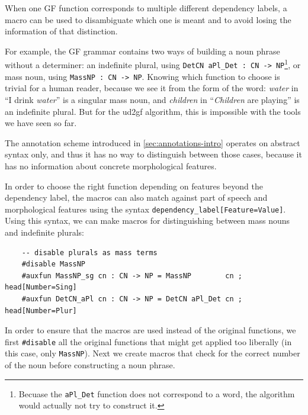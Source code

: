 When one GF function corresponds to multiple different dependency labels, a macro can be used to disambiguate which one is meant and to avoid losing the information of that distinction.

For example, the GF grammar contains two ways of building a noun phrase without a determiner:
an indefinite plural, using \verb|DetCN aPl_Det : CN -> NP|\footnote{Becuase the \texttt{aPl\_Det} function does not correspond to a word, the algorithm would actually not try to construct it.}, or mass noun, using \verb|MassNP : CN -> NP|.
Knowing which function to choose is trivial for a human reader, because we see it from the form of the word: \emph{water} in ``I drink \emph{water}'' is a singular mass noun, and \emph{children} in ``\emph{Children} are playing'' is an indefinite plural. But for the ud2gf algorithm, this is impossible with the tools we have seen so far. %

The annotation scheme introduced in \autoref{sec:annotations-intro} operates on abstract syntax only, and thus it has no way to distinguish between those cases, because it has no information about concrete morphological features.

In order to choose the right function depending on features beyond the dependency label, the macros can also match against part of speech and morphological features using the syntax \verb|dependency_label[Feature=Value]|. Using this syntax, we can make macros for distinguishing between mass nouns and indefinite plurals:

\begin{lstlisting}
    -- disable plurals as mass terms
    #disable MassNP
    #auxfun MassNP_sg cn : CN -> NP = MassNP        cn ; head[Number=Sing]
    #auxfun DetCN_aPl cn : CN -> NP = DetCN aPl_Det cn ; head[Number=Plur]
\end{lstlisting}

In order to ensure that the macros are used instead of the original functions, we first \verb|#disable| all the original functions that might get applied too liberally (in this case, only \verb|MassNP|).
Next we create macros that check for the correct number of the noun before constructing a noun phrase.

